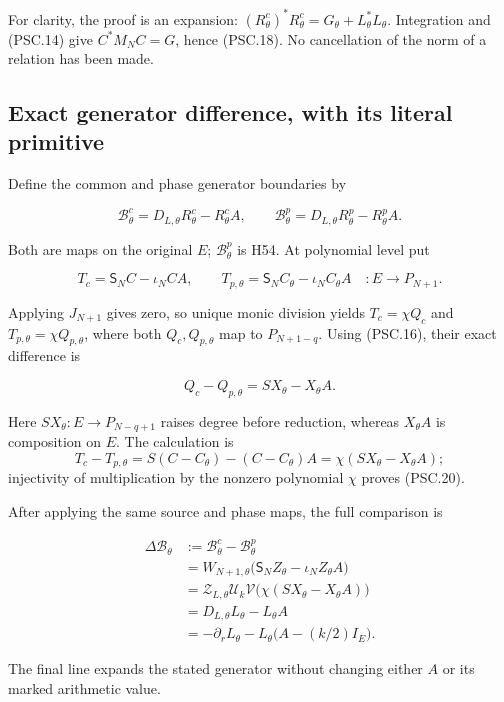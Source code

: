 For clarity, the proof is an expansion:
\((R^c_\theta)^*R^c_\theta
=G_\theta+L_\theta^*L_\theta\).
Integration and (PSC.14) give \(C^*M_NC=G\), hence (PSC.18). No cancellation of the norm of a relation has been made.

\subsection{Exact generator difference, with its literal primitive}

Define the common and phase generator boundaries by

\[
 \mathscr B^c_\theta
 =D_{L,\theta}R^c_\theta-R^c_\theta A,\qquad
 \mathscr B^p_\theta
 =D_{L,\theta}R^p_\theta-R^p_\theta A.
 \tag{PSC.19}
\]

Both are maps on the original \(E\); \(\mathscr B^p_\theta\) is H54. At polynomial level put

\[
 T_c=\mathsf S_NC-\iota_NCA,\qquad
 T_{p,\theta}=\mathsf S_NC_\theta-\iota_NC_\theta A
 \quad:E\longrightarrow P_{N+1}.
\]

Applying \(J_{N+1}\) gives zero, so unique monic division yields
\(T_c=\chi Q_c\) and \(T_{p,\theta}=\chi Q_{p,\theta}\), where both
\(Q_c,Q_{p,\theta}\) map to \(P_{N+1-q}\). Using (PSC.16), their exact difference is

\[
 Q_c-Q_{p,\theta}=SX_\theta-X_\theta A.
 \tag{PSC.20}
\]

Here \(SX_\theta:E\to P_{N-q+1}\) raises degree before reduction, whereas \(X_\theta A\) is composition on \(E\). The calculation is
\[
 T_c-T_{p,\theta}
 =S(C-C_\theta)-(C-C_\theta)A
 =\chi(SX_\theta-X_\theta A);
\]
injectivity of multiplication by the nonzero polynomial \(\chi\) proves (PSC.20).

After applying the same source and phase maps, the full comparison is

\[
 \boxed{
 \begin{aligned}
 \Delta\mathscr B_\theta
 &:=\mathscr B^c_\theta-\mathscr B^p_\theta\\
 &=W_{N+1,\theta}\bigl(\mathsf S_NZ_\theta-\iota_NZ_\theta A\bigr)\\
 &=\mathcal Z_{L,\theta}\mathcal U_k
   \mathcal V\bigl(\chi(SX_\theta-X_\theta A)\bigr)\\
 &=D_{L,\theta}L_\theta-L_\theta A\\
 &=-\partial_rL_\theta-L_\theta\bigl(A-(k/2)I_E\bigr).
 \end{aligned}}
 \tag{PSC.21}
\]

The final line expands the stated generator without changing either \(A\) or its marked arithmetic value.

